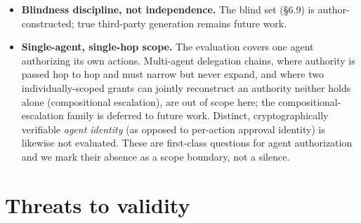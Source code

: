 \documentclass[11pt]{article}
\begin{document}
\begin{itemize}
 (all 29 carry \texttt{provider:\ mock\_stripe}), operation swap (all 29 carry
 \texttt{operation:\ buy}), account re-attribution (all 29 carry a single \texttt{account\_id};
 \texttt{mutate:drop-account} removes the field, it does not re-target), idempotency-key reuse
 across two distinct payloads, and approval-missing execution. What F4's zero bounds is therefore
 the \textbf{payload-divergence} class, not the join as a whole. The account gap compounds with a
 defect in the oracle: \texttt{effects\_for/2} matches on provider, operation and
 idempotency-key hash and never compares \texttt{account\_id}, so SPEC \S3's pre-committed ``right
 action, wrong attribution'' edge case is neither tested nor testable in this harness. We state
 the two together because either alone understates the hole.
\item
 \textbf{Blindness discipline, not independence.} The blind set (\S6.9) is author-constructed;
 true third-party generation remains future work.
\item
 \textbf{Single-agent, single-hop scope.} The evaluation covers one agent authorizing its own
 actions. Multi-agent delegation chains, where authority is passed hop to hop and must
 narrow but never expand, and where two individually-scoped grants can jointly reconstruct an
 authority neither holds alone (compositional escalation), are out of scope here; the
 compositional-escalation family is deferred to future work. Distinct, cryptographically
 verifiable \emph{agent identity} (as opposed to per-action approval identity) is likewise not
 evaluated. These are first-class questions for agent authorization and we mark their absence
 as a scope boundary, not a silence.
\end{itemize}

\section{Threats to validity}\label{threats-to-validity}
\end{document}
